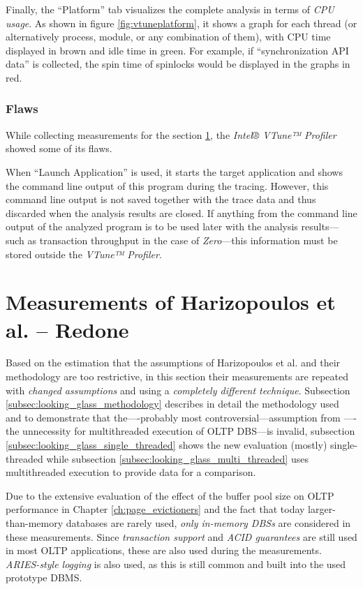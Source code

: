     Finally, the ``Platform'' tab visualizes the complete analysis in terms of \emph{CPU usage}. As shown in figure \ref{fig:vtuneplatform}, it shows a graph for each thread (or alternatively process, module, or any combination of them), with CPU time displayed in brown and idle time in green. For example, if ``synchronization API data'' is collected, the spin time of spinlocks would be displayed in the graphs in red.

\subsubsection{Flaws}

    While collecting measurements for the section \ref{sec:looking_glass}, the \textit{Intel® VTune™ Profiler} showed some of its flaws.

    When ``Launch Application'' is used, it starts the target application and shows the command line output of this program during the tracing. However, this command line output is not saved together with the trace data and thus discarded when the analysis results are closed. If anything from the command line output of the analyzed program is to be used later with the analysis results---such as transaction throughput in the case of \textit{Zero}---this information must be stored outside the \textit{VTune™ Profiler}.

\section{Measurements of Harizopoulos et al. -- Redone} \label{sec:looking_glass}

    Based on the estimation that the assumptions of Harizopoulos et al. and their methodology are too restrictive, in this section their measurements are repeated with \emph{changed assumptions} and using a \emph{completely different technique}. Subsection \ref{subsec:looking_glass_methodology} describes in detail the methodology used and to demonstrate that the----probably most controversial---assumption from \cite{Harizopoulos:2008}----the unnecessity for multithreaded execution of OLTP DBS---is invalid, subsection \ref{subsec:looking_glass_single_threaded} shows the new evaluation (mostly) single-threaded while subsection \ref{subsec:looking_glass_multi_threaded} uses multithreaded execution to provide data for a comparison.

    Due to the extensive evaluation of the effect of the buffer pool size on OLTP performance in Chapter \ref{ch:page_evictioners} and the fact that today larger-than-memory databases are rarely used, \emph{only in-memory DBSs} are considered in these measurements. Since \emph{transaction support} and \emph{ACID guarantees} are still used in most OLTP applications, these are also used during the measurements. \emph{ARIES-style logging} is also used, as this is still common and built into the used prototype DBMS.

